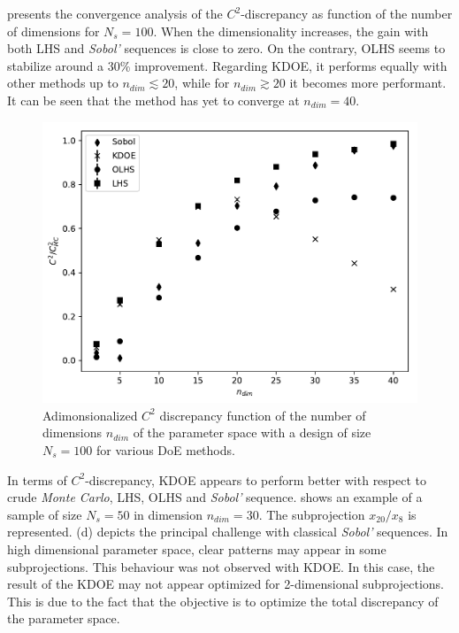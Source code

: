 \newpage


 presents the convergence analysis of the $C^2$-discrepancy as function of the number of dimensions for $N_s = 100$. When the dimensionality increases, the gain with both LHS and \emph{Sobol'} sequences is close to zero. On the contrary, OLHS seems to stabilize around a 30\% improvement. Regarding KDOE, it performs equally with other methods up to $n_{dim} \lesssim 20$, while for $n_{dim} \gtrsim 20$ it becomes more performant. It can be seen that the method has yet to converge at $n_{dim} = 40$.

\begin{figure}[!h]
\centering
\includegraphics[width=0.9\linewidth,keepaspectratio]{fig/contributions/doe/kde_dim.pdf}
\caption{Adimonsionalized $C^2$ discrepancy function of the number of dimensions $n_{dim}$ of the parameter space with a design of size $N_s = 100$ for various DoE methods.}
\label{fig:conv-dim-100}
\end{figure}

In terms of $C^2$-discrepancy, KDOE appears to perform better with respect to crude \emph{Monte Carlo}, LHS, OLHS and \emph{Sobol'} sequence.  shows an example of a sample of size $N_s = 50$ in dimension $n_{dim}=30$. The subprojection $x_{20}/x_8$ is represented. (d) depicts the principal challenge with classical \emph{Sobol'} sequences. In high dimensional parameter space, clear patterns may appear in some subprojections. This behaviour was not observed with KDOE. In this case, the result of the KDOE may not appear optimized for 2-dimensional subprojections. This is due to the fact that the objective is to optimize the total discrepancy of the parameter space.

